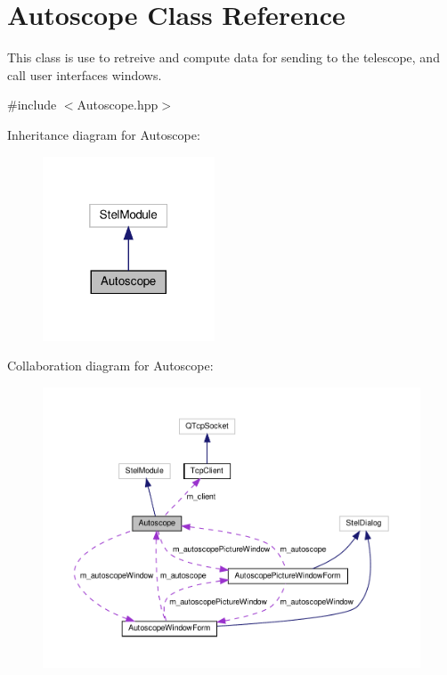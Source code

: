 \hypertarget{class_autoscope}{}\section{Autoscope Class Reference}
\label{class_autoscope}


This class is use to retreive and compute data for sending to the telescope, and call user interfaces windows.  




{\ttfamily \#include $<$Autoscope.\+hpp$>$}



Inheritance diagram for Autoscope\+:\nopagebreak
\begin{figure}[H]
\begin{center}
\leavevmode
\includegraphics[width=145pt]{class_autoscope__inherit__graph}
\end{center}
\end{figure}


Collaboration diagram for Autoscope\+:\nopagebreak
\begin{figure}[H]
\begin{center}
\leavevmode
\includegraphics[width=350pt]{class_autoscope__coll__graph}
\end{center}
\end{figure}
